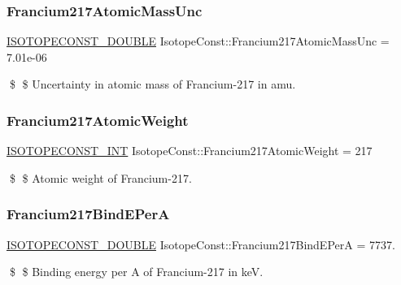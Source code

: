 \subsubsection{\texorpdfstring{Francium217\+Atomic\+Mass\+Unc}{Francium217AtomicMassUnc}}
{\footnotesize\ttfamily \mbox{\hyperlink{group___isotope_const-_macros_ga8f45a7272ce02c0b4c65c44636ed719a}{I\+S\+O\+T\+O\+P\+E\+C\+O\+N\+S\+T\+\_\+\+D\+O\+U\+B\+LE}} Isotope\+Const\+::\+Francium217\+Atomic\+Mass\+Unc = 7.\+01e-\/06}

\$ \$ Uncertainty in atomic mass of Francium-\/217 in amu. \mbox{\label{group___isotope_const-_francium-_fr217_ga8b65b93aa1b82335e04d5936fd0bdeaa}} 
\subsubsection{\texorpdfstring{Francium217\+Atomic\+Weight}{Francium217AtomicWeight}}
{\footnotesize\ttfamily \mbox{\hyperlink{group___isotope_const-_macros_ga5f18360b3e99483a35c32d789e62621c}{I\+S\+O\+T\+O\+P\+E\+C\+O\+N\+S\+T\+\_\+\+I\+NT}} Isotope\+Const\+::\+Francium217\+Atomic\+Weight = 217}

\$ \$ Atomic weight of Francium-\/217. \mbox{\label{group___isotope_const-_francium-_fr217_gab5b050603c40986b9aae279033c14d2a}} 
\subsubsection{\texorpdfstring{Francium217\+Bind\+E\+PerA}{Francium217BindEPerA}}
{\footnotesize\ttfamily \mbox{\hyperlink{group___isotope_const-_macros_ga8f45a7272ce02c0b4c65c44636ed719a}{I\+S\+O\+T\+O\+P\+E\+C\+O\+N\+S\+T\+\_\+\+D\+O\+U\+B\+LE}} Isotope\+Const\+::\+Francium217\+Bind\+E\+PerA = 7737.}

\$ \$ Binding energy per A of Francium-\/217 in keV. \mbox{\label{group___isotope_const-_francium-_fr217_gab0e4a5f6c3b0ccc5785d24ebaeb0792f}} 
